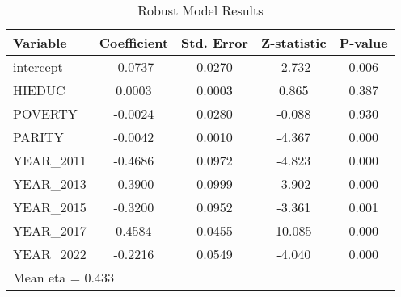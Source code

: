 \begin{table}[htbp]
\centering
\caption{Robust Model Results}
\label{tab:robust_results}
\begin{tabular}{lcccc}
\hline
Variable & Coefficient & Std. Error & Z-statistic & P-value \\
\hline
intercept & -0.0737 & 0.0270 & -2.732 & 0.006 \\
HIEDUC & 0.0003 & 0.0003 & 0.865 & 0.387 \\
POVERTY & -0.0024 & 0.0280 & -0.088 & 0.930 \\
PARITY & -0.0042 & 0.0010 & -4.367 & 0.000 \\
YEAR\_2011 & -0.4686 & 0.0972 & -4.823 & 0.000 \\
YEAR\_2013 & -0.3900 & 0.0999 & -3.902 & 0.000 \\
YEAR\_2015 & -0.3200 & 0.0952 & -3.361 & 0.001 \\
YEAR\_2017 & 0.4584 & 0.0455 & 10.085 & 0.000 \\
YEAR\_2022 & -0.2216 & 0.0549 & -4.040 & 0.000 \\
\hline
\multicolumn{5}{l}{Mean eta = 0.433}
\end{tabular}
\end{table}